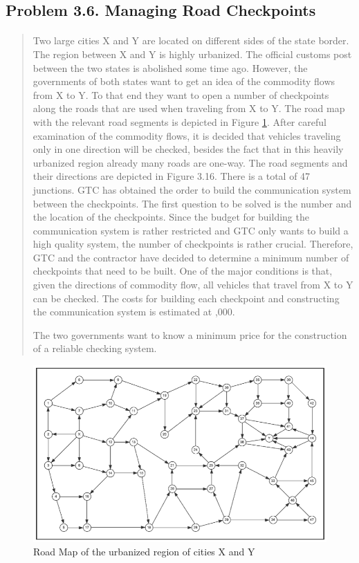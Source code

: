 \subsection{Problem 3.6. Managing Road Checkpoints}

\paragraph{}
\begin{quote}
Two large cities X and Y are located on different sides of the state border. The region between X and Y is highly urbanized. The official customs post between the two states is abolished some time ago. However, the governments of both states want to get an idea of the commodity flows from X to Y. To that end they want to open a number of checkpoints along the roads that are used when traveling from X to Y. The road map with the relevant road segments is depicted in Figure \ref{network3-6}. After careful examination of the commodity flows, it is decided that vehicles traveling only in one direction will be checked, besides the fact that in this heavily urbanized region already many roads are one-way. The road segments and their directions are depicted in Figure 3.16. There is a total of 47 junctions. GTC has obtained the order to build the communication system between the checkpoints. The first question to be solved is the number and the location of the checkpoints. Since the budget for building the communication system is rather restricted and GTC only wants to build a high quality system, the number of checkpoints is rather crucial. Therefore, GTC and the contractor have decided to determine a minimum number of checkpoints that need to be built. One of the major conditions is that, given the directions of commodity flow, all vehicles that travel from X to Y can be checked. The costs for building each checkpoint and constructing the communication system is estimated at ,000.

The two governments want to know a minimum price for the construction of a reliable checking system.
\end{quote}

\begin{figure}[H]
	\centering
	\includegraphics[scale=1]{./img/figure3-16.png}
	\caption{Road Map of the urbanized region of cities X and Y}
	\label{network3-6}
\end{figure}

